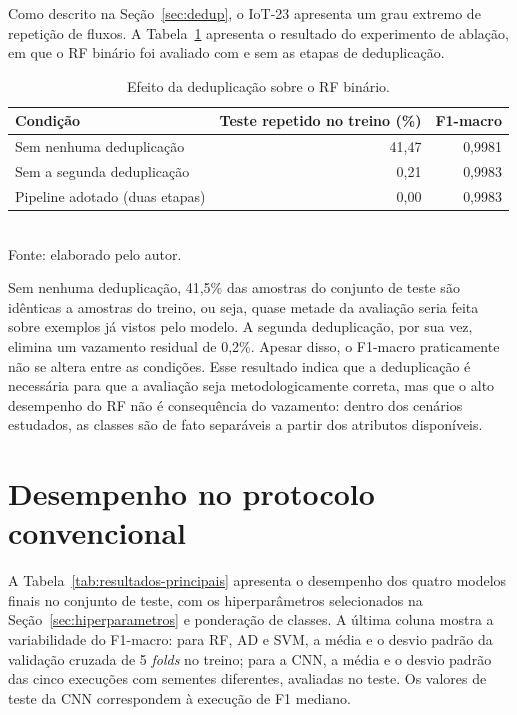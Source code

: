 Como descrito na Seção~\ref{sec:dedup}, o IoT-23 apresenta um grau extremo de repetição de fluxos. A Tabela~\ref{tab:ablacao} apresenta o resultado do experimento de ablação, em que o RF binário foi avaliado com e sem as etapas de deduplicação.

\begin{table}[htbp]
\centering
\caption{Efeito da deduplicação sobre o RF binário.}
\label{tab:ablacao}
\begin{tabular}{lrr}
\toprule
\textbf{Condição} & \textbf{Teste repetido no treino (\%)} & \textbf{F1-macro} \\
\midrule
Sem nenhuma deduplicação         & 41,47 & 0,9981 \\
Sem a segunda deduplicação       &  0,21 & 0,9983 \\
Pipeline adotado (duas etapas)   &  0,00 & 0,9983 \\
\bottomrule
\end{tabular}
\\[2pt]
\small{Fonte: elaborado pelo autor.}
\end{table}

Sem nenhuma deduplicação, 41,5\% das amostras do conjunto de teste são idênticas a amostras do treino, ou seja, quase metade da avaliação seria feita sobre exemplos já vistos pelo modelo. A segunda deduplicação, por sua vez, elimina um vazamento residual de 0,2\%. Apesar disso, o F1-macro praticamente não se altera entre as condições. Esse resultado indica que a deduplicação é necessária para que a avaliação seja metodologicamente correta, mas que o alto desempenho do RF não é consequência do vazamento: dentro dos cenários estudados, as classes são de fato separáveis a partir dos atributos disponíveis.

\section{Desempenho no protocolo convencional}
\label{sec:res-convencional}

A Tabela~\ref{tab:resultados-principais} apresenta o desempenho dos quatro modelos finais no conjunto de teste, com os hiperparâmetros selecionados na Seção~\ref{sec:hiperparametros} e ponderação de classes. A última coluna mostra a variabilidade do F1-macro: para RF, AD e SVM, a média e o desvio padrão da validação cruzada de 5 \textit{folds} no treino; para a CNN, a média e o desvio padrão das cinco execuções com sementes diferentes, avaliadas no teste. Os valores de teste da CNN correspondem à execução de F1 mediano.

